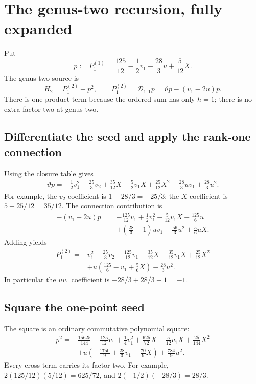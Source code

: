 \documentclass[11pt,a4paper]{article}
\numberwithin{equation}{section}
\newcommand{\tht}{\vartheta}
\newcommand{\Pg}[2]{P_{#1}^{(#2)}}
\begin{document}
\section{The genus-two recursion, fully expanded}
\label{sec:g2}

Put
\begin{equation}
p:=\Pg11=\frac{125}{12}-\frac12v_1-\frac{28}{3}u+\frac5{12}X.
\end{equation}
The genus-two source is
\begin{equation}
H_2=\Pg12+p^2,\qquad
\Pg12=\mathcal D_{1,1}p=\tht p-(v_1-2u)p.
\end{equation}
There is one product term because the ordered sum has only $h=1$;
there is no extra factor two at genus two.

\subsection{Differentiate the seed and apply the rank-one connection}
Using the closure table gives
\begin{align}
\tht p={}&\frac12v_1^2-\frac{25}{3}v_2+\frac{35}{12}X
 -\frac52v_1X+\frac{25}{12}X^2
 -\frac{28}{3}uv_1+\frac{28}{3}u^2.
\end{align}
For example, the $v_2$ coefficient is $1-28/3=-25/3$;
the $X$ coefficient is $5-25/12=35/12$.
The connection contribution is
\begin{align}
-(v_1-2u)p={}&-\frac{125}{12}v_1+\frac12v_1^2
 -\frac5{12}v_1X+\frac{125}{6}u\\
 &+\left(\frac{28}{3}-1\right)uv_1
 -\frac{56}{3}u^2+\frac56uX.
\end{align}
Adding yields
\begin{align}
\Pg12={}&v_1^2-\frac{25}{3}v_2-\frac{125}{12}v_1
 +\frac{35}{12}X-\frac{35}{12}v_1X+\frac{25}{12}X^2\\
 &+u\left(\frac{125}{6}-v_1+\frac56X\right)-\frac{28}{3}u^2.
\label{eq:P12}
\end{align}
In particular the $uv_1$ coefficient is $-28/3+28/3-1=-1$.

\subsection{Square the one-point seed}
The square is an ordinary commutative polynomial square:
\begin{align}
p^2={}&\frac{15625}{144}-\frac{125}{12}v_1+\frac14v_1^2
 +\frac{625}{72}X-\frac5{12}v_1X+\frac{25}{144}X^2\\
 &+u\left(-\frac{1750}{9}+\frac{28}{3}v_1-\frac{70}{9}X\right)
 +\frac{784}{9}u^2.
\end{align}
Every cross term carries its factor two. For example,
$2(125/12)(5/12)=625/72$, and
$2(-1/2)(-28/3)=28/3$.
\end{document}
